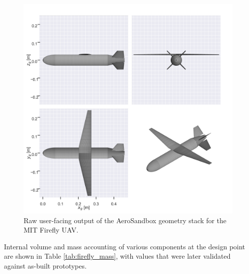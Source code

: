 \begin{figure}[h]
    \centering
    \includegraphics[width=\textwidth]{../figures/firefly_geometry.png}
    \caption{Raw user-facing output of the AeroSandbox geometry stack for the MIT Firefly UAV.}
    \label{fig:firefly_geometry}
\end{figure}

Internal volume and mass accounting of various components at the design point are shown in Table \ref{tab:firefly_mass}, with values that were later validated against as-built prototypes.

